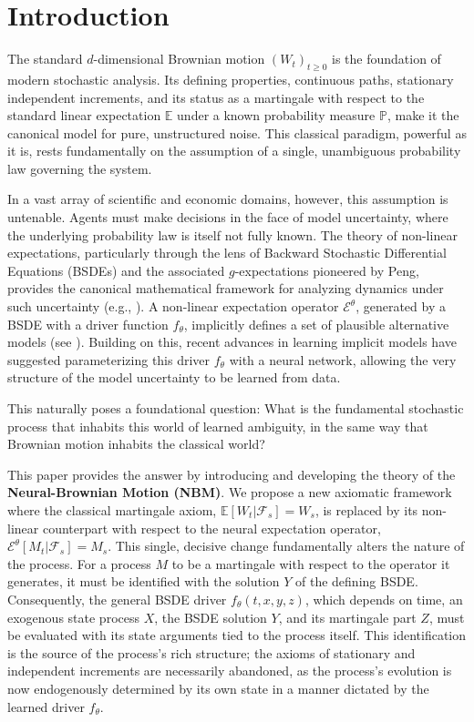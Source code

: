 \documentclass[qian]{imsart}
\newcommand{\Prob}{\mathbb{P}}
\newcommand{\E}{\mathbb{E}}
\newcommand{\Fcal}{\mathcal{F}}
\newcommand{\cEneutheta}{\mathcal{E}^{\theta}}
\theoremstyle{plain}
\theoremstyle{definition}
\begin{document}
\section{Introduction}

The standard $d$-dimensional Brownian motion $(W_t)_{t \ge 0}$ is the foundation of modern stochastic analysis. Its defining properties, continuous paths, stationary independent increments, and its status as a martingale with respect to the standard linear expectation $\E$ under a known probability measure $\Prob$, make it the canonical model for pure, unstructured noise. This classical paradigm, powerful as it is, rests fundamentally on the assumption of a single, unambiguous probability law governing the system.

In a vast array of scientific and economic domains, however, this assumption is untenable. Agents must make decisions in the face of model uncertainty, where the underlying probability law is itself not fully known. The theory of non-linear expectations, particularly through the lens of Backward Stochastic Differential Equations (BSDEs) and the associated $g$-expectations pioneered by Peng, provides the canonical mathematical framework for analyzing dynamics under such uncertainty (e.g., \cite{PardouxPeng1990,ElKarouiPengQuenez1997}). A non-linear expectation operator $\cEneutheta$, generated by a BSDE with a driver function $f_\theta$, implicitly defines a set of plausible alternative models (see \cite{qi2025neuralexpectationoperators}). Building on this, recent advances in learning implicit models have suggested parameterizing this driver $f_\theta$ with a neural network, allowing the very structure of the model uncertainty to be learned from data.

This naturally poses a foundational question: What is the fundamental stochastic process that inhabits this world of learned ambiguity, in the same way that Brownian motion inhabits the classical world?

This paper provides the answer by introducing and developing the theory of the \textbf{Neural-Brownian Motion (NBM)}. We propose a new axiomatic framework where the classical martingale axiom, $\E[W_t|\Fcal_s] = W_s$, is replaced by its non-linear counterpart with respect to the neural expectation operator, $\cEneutheta[M_t|\Fcal_s] = M_s$. This single, decisive change fundamentally alters the nature of the process. For a process $M$ to be a martingale with respect to the operator it generates, it must be identified with the solution $Y$ of the defining BSDE. Consequently, the general BSDE driver $f_\theta(t, x, y, z)$, which depends on time, an exogenous state process $X$, the BSDE solution $Y$, and its martingale part $Z$, must be evaluated with its state arguments tied to the process itself. This identification is the source of the process's rich structure; the axioms of stationary and independent increments are necessarily abandoned, as the process's evolution is now endogenously determined by its own state in a manner dictated by the learned driver $f_\theta$.
\end{document}
